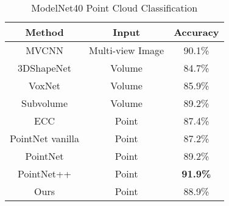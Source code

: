 \documentclass[10pt,twocolumn,letterpaper]{article}
\begin{document}
\begin{table}[]
\centering
\caption{ModelNet40 Point Cloud Classification}
\label{tab-modelnet40}
    \begin{tabular}{c|cc}
        Method           & Input            & Accuracy \\ \hline
        MVCNN \cite{mvcnn}           & Multi-view Image & 90.1\%      \\
        3DShapeNet \cite{modelnet40}       & Volume           & 84.7\%      \\
        VoxNet \cite{voxnet}           & Volume           & 85.9\%      \\
        Subvolume \cite{subvolume}        & Volume           & 89.2\%      \\
        ECC \cite{ecc}              & Point            & 87.4\%      \\
        PointNet vanilla \cite{pointnet} & Point            & 87.2\%      \\
        PointNet \cite{pointnet}         & Point            & 89.2\%      \\
        PointNet++ \cite{pointnet2}       & Point            & \textbf{91.9\%}      \\
        Ours             & Point            & 88.9\%     
    \end{tabular}
\end{table} 
\end{document}
